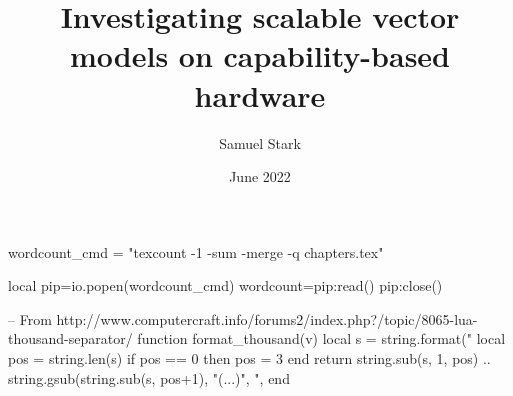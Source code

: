 
\title{Investigating scalable vector models on capability-based hardware}

\author{Samuel Stark}





\date{June 2022}

\begin{luacode*}
wordcount_cmd = "texcount -1 -sum -merge -q chapters.tex"

local pip=io.popen(wordcount_cmd)
wordcount=pip:read()
pip:close()
    
-- From http://www.computercraft.info/forums2/index.php?/topic/8065-lua-thousand-separator/
function format_thousand(v)
    local s = string.format("%
    local pos = string.len(s) %
    if pos == 0 then pos = 3 end
    return string.sub(s, 1, pos)
    .. string.gsub(string.sub(s, pos+1), "(...)", ",%
end
\end{luacode*}

